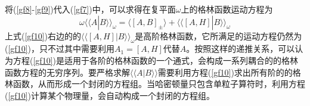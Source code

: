 将(\ref{gf8}-\ref{gf9})代入(\ref{gf7})中，可以求得在复平面$\omega$上的格林函数运动方程为
\begin{equation}
\omega\langle\langle A|B\rangle\rangle_\omega=\langle\left[A,B\right]_\pm\rangle+\langle\langle\left[A,H\right]|B\rangle\rangle_\omega\label{gf10}
\end{equation}
上式(\ref{gf10})右边的的$\langle\langle\left[A,H\right]|B\rangle\rangle_\omega$是高阶格林函数，它所满足的运动方程仍然为(\ref{gf10})，只不过其中需要利用$A_1=\left[A,H\right]$代替$A$。按照这样的递推关系，可以认为方程(\ref{gf10})是适用于各阶的格林函数的一个通式，会构成一系列耦合的的格林函数方程的无穷序列。要严格求解$\langle\langle A|B\rangle\rangle$需要利用方程(\ref{gf10})求出所有阶的的格林函数，从而形成一个封闭的方程组。当哈密顿量只包含单粒子算符时，利用方程(\ref{gf10})计算某个物理量，会自动构成一个封闭的方程组。

